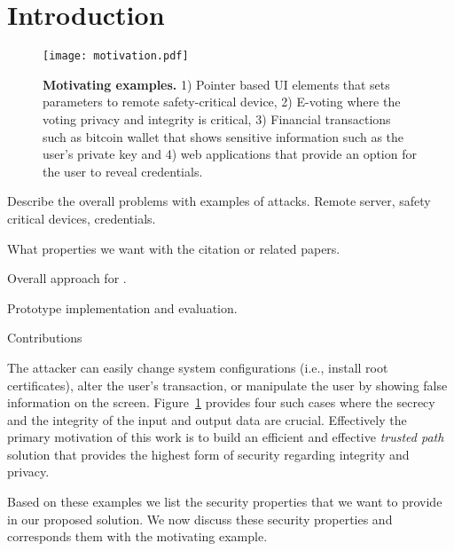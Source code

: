 \section{Introduction}
\label{sec:intro}



\begin{figure}[t]
\centering
\texttt{[image: motivation.pdf]}
\caption{\textbf{Motivating examples.} 1) Pointer based UI elements that sets parameters to remote safety-critical device, 2) E-voting where the voting privacy and integrity is critical, 3) Financial transactions such as bitcoin wallet that shows sensitive information such as the user's private key and 4) web applications that provide an option for the user to reveal credentials.}
\label{fig:motivation}
\centering
\end{figure}

Describe the overall problems with examples of attacks. Remote server, safety critical devices, credentials.

What properties we want with the citation or related papers.


Overall approach for \name.


Prototype implementation and evaluation.


Contributions

\iffalse
{} The attacker can easily change system configurations (i.e., install root certificates), alter the user's transaction, or manipulate the user by showing false information on the screen. Figure~\ref{fig:motivation} provides four such cases where the secrecy and the integrity of the input and output data are crucial. Effectively the primary motivation of this work is to build an efficient and effective \emph{trusted path} solution that provides the highest form of security regarding integrity and privacy. 

Based on these examples we list the security properties that we want to provide in our proposed solution. We now discuss these security properties and corresponds them with the motivating example.

